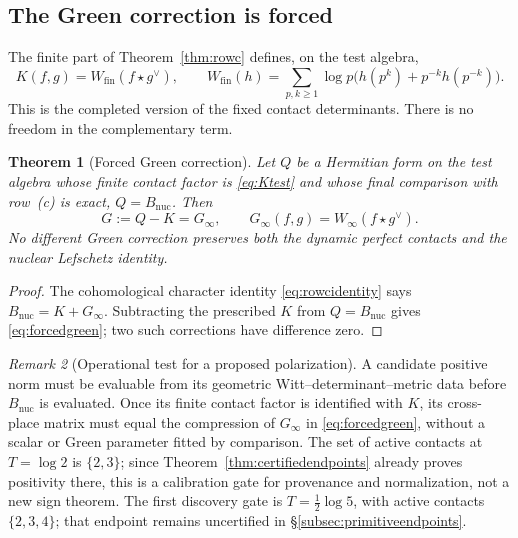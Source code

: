 \documentclass[11pt]{amsart}
\newtheorem{theorem}{Theorem}[section]
\theoremstyle{definition}
\theoremstyle{remark}
\newtheorem{remark}[theorem]{Remark}
\begin{document}
\subsection{The Green correction is forced}

The finite part of Theorem~\ref{thm:rowc} defines, on the test algebra,
\begin{equation}\label{eq:Ktest}
 K(f,g)=W_{\mathrm{fin}}(f\star g^\vee),\qquad
 W_{\mathrm{fin}}(h)=\sum_{p,k\ge1}\log p
 \bigl(h(p^k)+p^{-k}h(p^{-k})\bigr).
\end{equation}
This is the completed version of the fixed contact determinants.  There is
no freedom in the complementary term.

\begin{theorem}[Forced Green correction]
\label{thm:forcedgreen}
Let $Q$ be a Hermitian form on the test algebra whose finite contact factor
is \eqref{eq:Ktest} and whose final comparison with row~(c) is exact,
$Q=B_{\mathrm{nuc}}$.  Then
\begin{equation}\label{eq:forcedgreen}
 G:=Q-K=G_\infty,\qquad
 G_\infty(f,g)=W_\infty(f\star g^\vee).
\end{equation}
No different Green correction preserves both the dynamic perfect contacts and the
nuclear Lefschetz identity.
\end{theorem}

\begin{proof}
The cohomological character identity \eqref{eq:rowcidentity} says
$B_{\mathrm{nuc}}=K+G_\infty$.  Subtracting the prescribed $K$ from
$Q=B_{\mathrm{nuc}}$ gives \eqref{eq:forcedgreen}; two such corrections have
difference zero.
\end{proof}

\begin{remark}[Operational test for a proposed polarization]
\label{rem:operationalpolarizationtest}
A candidate positive norm must be evaluable from its geometric
Witt--determinant--metric data before $B_{\mathrm{nuc}}$ is evaluated.  Once
its finite contact factor is identified with $K$, its cross-place matrix must
equal the compression of $G_\infty$ in \eqref{eq:forcedgreen}, without a
scalar or Green parameter fitted by comparison.  The set of active contacts
at $T=\log2$ is $\{2,3\}$; since Theorem~\ref{thm:certifiedendpoints} already
proves positivity there, this is a calibration gate for provenance and
normalization, not a new sign theorem.  The first discovery gate is
$T=\frac12\log5$, with active contacts $\{2,3,4\}$; that endpoint remains
uncertified in \S\ref{subsec:primitiveendpoints}.
\end{remark}
\end{document}
